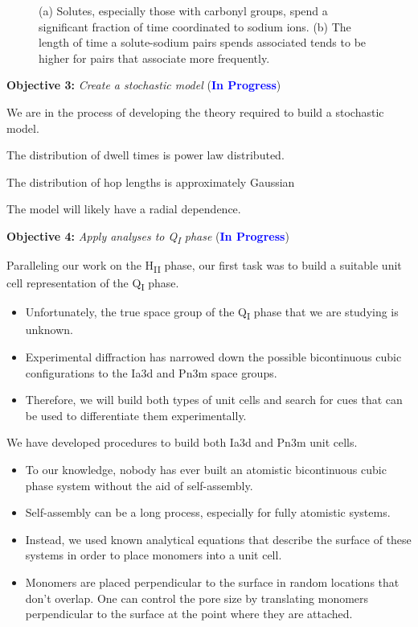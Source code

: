 \documentclass{article}
\begin{document}
\begin{figure}[!htb]
\begin{subfigure}{0.45\textwidth}
  \caption{}\label{fig:all_NA_dwells}
  \end{subfigure}
  \caption{(a) Solutes, especially those with carbonyl groups, spend a
  significant fraction of time coordinated to sodium ions. (b) The length
  of time a solute-sodium pairs spends associated tends to be higher for
  pairs that associate more frequently.}\label{fig:na_coordination}
  \end{figure}
  
  \noindent \textbf{\large Objective 3:} \textit{\large Create a stochastic model} (\textcolor{blue}{\textbf{In Progress}})
  
  \noindent We are in the process of developing the theory required to build a 
  stochastic model. 
  
  \noindent The distribution of dwell times is power law distributed.
  
  \noindent The distribution of hop lengths is approximately Gaussian
  
  \noindent The model will likely have a radial dependence. 
  
  \noindent \textbf{\large Objective 4:} \textit{\large Apply analyses to Q\textsubscript{I} phase} (\textcolor{blue}{\textbf{In Progress}})
  
  Paralleling our work on the H\textsubscript{II} phase, our first task was to
  build a suitable unit cell representation of the Q\textsubscript{I} phase. 
  \begin{itemize}
    \item Unfortunately, the true space group of the Q\textsubscript{I}
    phase that we are studying is unknown. 
    \item Experimental diffraction has narrowed down the possible bicontinuous
    cubic configurations to the Ia3d and Pn3m space groups. 
    \item Therefore, we will build both types of unit cells and search for
    cues that can be used to differentiate them experimentally.
  \end{itemize}  
  
  \noindent We have developed procedures to build both Ia3d and Pn3m unit
  cells.
  \begin{itemize}
    \item To our knowledge, nobody has ever built an atomistic bicontinuous
    cubic phase system without the aid of self-assembly.
    \item Self-assembly can be a long process, especially for fully atomistic
    systems. 
    \item Instead, we used known analytical equations that describe the 
    surface of these systems in order to place monomers into a unit cell.
    \item Monomers are placed perpendicular to the surface in random locations
    that don't overlap. One can control the pore size by translating monomers 
    perpendicular to the surface at the point where they are attached.
  \end{itemize}
  
\end{document}
